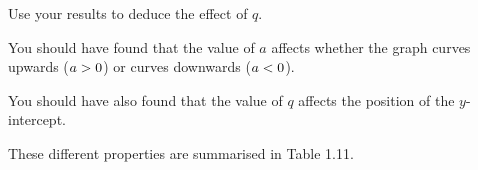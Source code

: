 \begin{enumerate}[noitemsep, label=\textbf{\arabic*}. ]
Use your results to deduce the effect of \begin{math}q\end{math}.
\end{enumerate}
        
        

        \label{m39348*id250340}You should have found that the value of \begin{math}a\end{math} affects whether the graph curves upwards (\begin{math}a>{}0\end{math}) or curves downwards (\begin{math}a<{}0\end{math}).\par 
        \label{m39348*id250385}You should have also found that the value of \begin{math}q\end{math} affects the position of the \begin{math}y\end{math}-intercept.\par 
        \label{m39348*id250408}These different properties are summarised in Table 1.11.\par 
        
    
      
    
    \setlength\mytablespace{6\tabcolsep}
    \addtolength\mytablespace{4\arrayrulewidth}
    \setlength\mytablewidth{\linewidth}
        
    
    \setlength\mytableroom{\mytablewidth}
    \addtolength\mytableroom{-\mytablespace}
    
    \setlength\myfixedwidth{0pt}
    \setlength\mystarwidth{\mytableroom}
        \addtolength\mystarwidth{-\myfixedwidth}
        \divide{}
        
